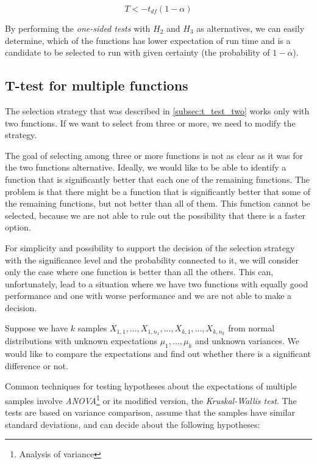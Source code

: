 \[T < -t_{df}(1-\alpha)\]

By performing the \textit{one-sided tests} with $H_2$ and $H_3$ as alternatives, we can easily determine, which of the functions has lower expectation of run time and is a candidate to be selected to run with given certainty (the probability of $1-\alpha$).

\subsection{T-test for multiple functions}
\label{subsec:t_test_multiple}

The selection strategy that was described in \ref{subsec:t_test_two} works only with two functions. If we want to select from three or more, we need to modify the strategy.

The goal of selecting among three or more functions is not as clear as it was for the two functions alternative. Ideally, we would like to be able to identify a function that is significantly better that each one of the remaining functions. The problem is that there might be a function that is significantly better that some of the remaining functions, but not better than all of them. This function cannot be selected, because we are not able to rule out the 
possibility that there is a faster option.

For simplicity and possibility to support the decision of the selection strategy with the significance level and the probability connected to it, we will consider only the case where one function is better than all the others. This can, unfortunately, lead to a situation where we have two functions with equally good performance and one with worse performance and we are not able to make a decision.

Suppose we have $k$ samples $X_{1,1}, ..., X_{1, n_1}, ..., X_{k,1}, ..., X_{k, n_k}$ from normal distributions with unknown expectations $\mu_1, ..., \mu_k$ and unknown variances. We would like to compare the expectations and find out whether there is a significant difference or not.

Common techniques for testing hypotheses about the expectations of multiple samples involve \textit{ANOVA}\footnote{Analysis of variance} or its modified version, the \textit{Kruskal-Wallis test}. The tests are based on variance comparison, assume that the samples have similar standard deviations, and can decide about the following hypotheses:


